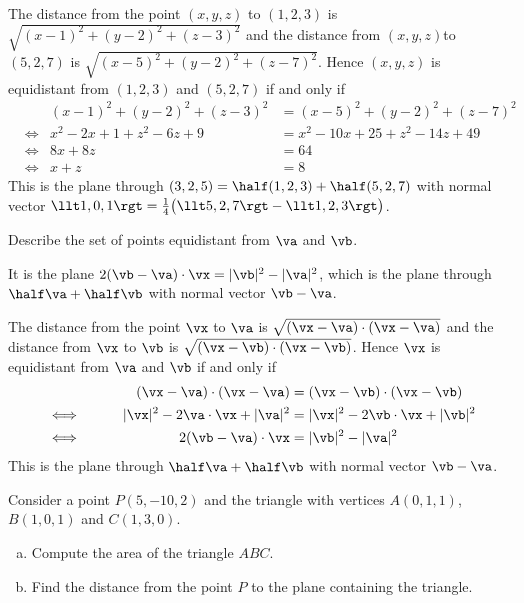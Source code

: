 \begin{solution}
The distance from the point $(x,y,z)$ to $(1,2,3)$
is $\sqrt{(x-1)^2+(y-2)^2+(z-3)^2}$ and 
the distance from $(x,y,z)$to $(5,2,7)$ is
$\sqrt{(x-5)^2+(y-2)^2+(z-7)^2}$. Hence $(x,y,z)$ is equidistant 
from $(1,2,3)$ and $(5,2,7)$ if and only if
\begin{align*}
& & (x-1)^2+(y-2)^2+(z-3)^2&=(x-5)^2+(y-2)^2+(z-7)^2\\
&\iff & x^2-2x+1+z^2-6z+9&=x^2-10x+25+z^2-14z+49\\
&\iff & 8x+8z&=64\\
&\iff & x+z&=8
\end{align*}
This is the plane through $(3,2,5)=\half(1,2,3)+\half(5,2,7)$
with normal vector
$\llt 1,0,1\rgt=\frac{1}{4}\big(\llt 5,2,7\rgt-\llt 1,2,3\rgt \big)$.
\end{solution}

\begin{question}
 Describe the set of points equidistant from $\va$ and $\vb$.
\end{question}


\begin{answer}
It is the plane $2(\vb-\va)\cdot\vx=|\vb|^2-|\va|^2$,
which is the plane through $\half\va+\half\vb$
with normal vector  $\vb-\va$.
\end{answer}

\begin{solution}
The distance from the point $\vx$ to $\va$ is 
$\sqrt{(\vx-\va)\cdot(\vx-\va)}$ and the distance from $\vx$ to $\vb$ is
$\sqrt{(\vx-\vb)\cdot(\vx-\vb)}$. Hence $\vx$ is equidistant 
from $\va$ and $\vb$ if and only if
\begin{alignat*}{3}
& & (\vx-\va)\cdot(\vx-\va)&=(\vx-\vb)\cdot(\vx-\vb) \\
&\iff\qquad & |\vx|^2-2\va\cdot\vx+|\va|^2&=|\vx|^2-2\vb\cdot\vx+|\vb|^2 \\
&\iff & 2(\vb-\va)\cdot\vx&=|\vb|^2-|\va|^2
\end{alignat*}
This is the plane through $\half\va+\half\vb$
with normal vector  $\vb-\va$.
\end{solution}

\begin{question} [M200 2003D] %
Consider a point $P(5,-10,2)$ and the triangle with vertices
$A(0,1,1)$, $B(1,0,1)$ and $C(1,3,0)$.
\begin{enumerate}[(a)]
\item 
Compute the area of the triangle $ABC$.
\item
Find the distance from the point $P$ to the plane containing
the triangle. 
\end{enumerate}
\end{question}

